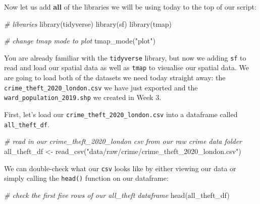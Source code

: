 \documentclass[
]{book}
\newenvironment{Shaded}{\begin{snugshade}}{\end{snugshade}}
\newcommand{\CommentTok}[1]{\textcolor[rgb]{0.56,0.35,0.01}{\textit{#1}}}
\newcommand{\FunctionTok}[1]{\textcolor[rgb]{0.00,0.00,0.00}{#1}}
\newcommand{\NormalTok}[1]{#1}
\newcommand{\OtherTok}[1]{\textcolor[rgb]{0.56,0.35,0.01}{#1}}
\newcommand{\StringTok}[1]{\textcolor[rgb]{0.31,0.60,0.02}{#1}}
\begin{document}
Now let us add \textbf{all} of the libraries we will be using today to the top of our script:

\begin{Shaded}
\begin{Highlighting}[]
\CommentTok{\# libraries}
\FunctionTok{library}\NormalTok{(tidyverse)}
\FunctionTok{library}\NormalTok{(sf)}
\FunctionTok{library}\NormalTok{(tmap)}
\end{Highlighting}
\end{Shaded}

\begin{Shaded}
\begin{Highlighting}[]
\CommentTok{\# change tmap mode to plot}
\FunctionTok{tmap\_mode}\NormalTok{(}\StringTok{"plot"}\NormalTok{)}
\end{Highlighting}
\end{Shaded}

You are already familiar with the \texttt{tidyverse} library, but now we adding \texttt{sf} to read and load our spatial data as well as \texttt{tmap} to visualise our spatial data. We are going to load both of the datasets we need today straight away: the \texttt{crime\_theft\_2020\_london.csv} we have just exported and the \texttt{ward\_population\_2019.shp} we created in Week 3.

First, let's load our \texttt{crime\_theft\_2020\_london.csv} into a dataframe called \texttt{all\_theft\_df}.

\begin{Shaded}
\begin{Highlighting}[]
\CommentTok{\# read in our crime\_theft\_2020\_london csv from our raw crime data folder}
\NormalTok{all\_theft\_df }\OtherTok{\textless{}{-}} \FunctionTok{read\_csv}\NormalTok{(}\StringTok{"data/raw/crime/crime\_theft\_2020\_london.csv"}\NormalTok{)}
\end{Highlighting}
\end{Shaded}

We can double-check what our \texttt{csv} looks like by either viewing our data or simply calling the \texttt{head()} function on our dataframe:

\begin{Shaded}
\begin{Highlighting}[]
\CommentTok{\# check the first five rows of our all\_theft dataframe}
\FunctionTok{head}\NormalTok{(all\_theft\_df)}
\end{Highlighting}
\end{Shaded}
\end{document}
